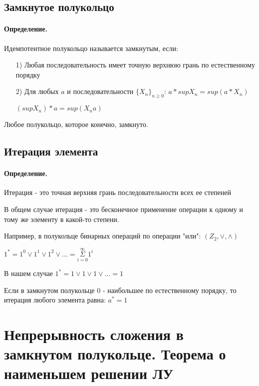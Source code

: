 \documentclass{report}
\begin{document}
\subsection{Замкнутое полукольцо}
\paragraph*{Определение.}
Идемпотентное полукольцо называется замкнутым, если:
\begin{itemize}
    \item[1)] Любая последовательность имеет точную верхнюю грань по естественному порядку
    \item[2)] Для любых $a$ и последовательности $\{X_n\}_{n \geq 0}$:\newline
        $a*supX_n = sup(a*X_n)$

        $(supX_n)*a = sup(X_n a)$
\end{itemize}


Любое полукольцо, которое конечно, замкнуто.

\subsection{Итерация элемента}
\paragraph*{Определение.} Итерация - это точная верхняя грань последовательности всех ее степеней


В общем случае итерация - это бесконечное применение операции к одному и тому же элементу в какой-то степени.

Например, в полукольце бинарных операций по операции "или":\newline
$(Z_2, \lor, \land)$

$1^*=1^0 \lor 1^1 \lor 1^2 \lor \ldots = \underset{i=0}{\overset{\infty}{\Sigma}}1^{i}$


В нашем случае $1^* = 1 \lor 1 \lor 1 \lor \dots = 1$

\medskip

Если в замкнутом полукольце $0$ - наибольшее по естественному порядку, то
итерация любого элемента равна: $a^* = 1$

\newpage

\section{Непрерывность сложения в замкнутом полукольце. Теорема о наименьшем решении ЛУ}
\end{document}
